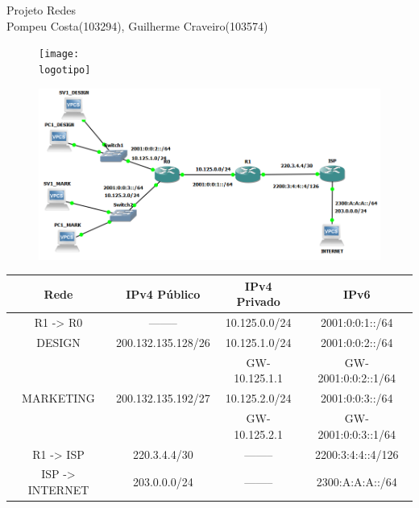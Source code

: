 \documentclass{report}
\begin{document}
%
\def\titulo{Projeto Redes}
\def\data{Dezembro 2021}
\def\autores{Pompeu Costa(103294), Guilherme Craveiro(103574)}
\def\logotipo{ua.pdf}
%
\begin{titlepage}

\begin{center}
%
\vspace*{50mm}
%
{\Huge \titulo}\\ 
%
\vspace{10mm}
%
%
\vspace{10mm}
%
{\LARGE \autores}\\ 
%
\vspace{30mm}
%
\begin{figure}[h]
\center
\texttt{[image: \\logotipo]}
\end{figure}
%
\vspace{30mm}
\end{center}
\end{titlepage}

\clearpage
{}

\begin{center}
\begin{figure}
    \centering
    \includegraphics[scale=0.65]{network.png}
\end{figure}
\end{center}
\begin{center}
    
\end{center}
\begin{tabular}{|c|c|c|c|}
    \hline
    Rede & IPv4 Público & IPv4 Privado & IPv6 \\
    \hline
    R1 -> R0 & -------- & 10.125.0.0/24 & 2001:0:0:1::/64 \\
    \hline
    DESIGN & 200.132.135.128/26 & 10.125.1.0/24 & 2001:0:0:2::/64 \\
    & & GW- 10.125.1.1 & GW- 2001:0:0:2::1/64\\
    \hline
    MARKETING & 200.132.135.192/27 & 10.125.2.0/24 & 2001:0:0:3::/64 \\
    & & GW- 10.125.2.1 & GW- 2001:0:0:3::1/64 \\
    \hline
    R1 -> ISP & 220.3.4.4/30 & -------- & 2200:3:4:4::4/126\\
    \hline
    ISP -> INTERNET & 203.0.0.0/24 & -------- & 2300:A:A:A::/64\\
    \hline
\end{tabular}
\end{document}
